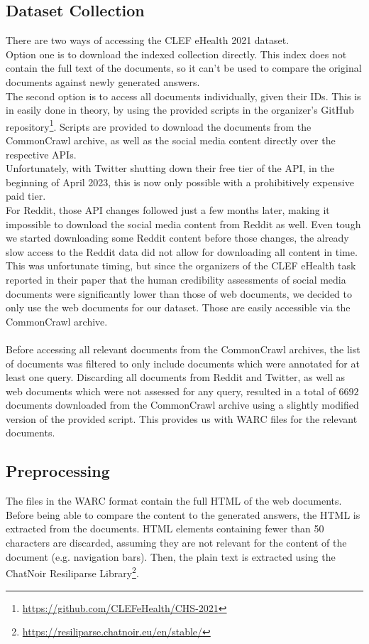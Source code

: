 \subsection{Dataset Collection}
There are two ways of accessing the CLEF eHealth 2021 dataset.
\\
Option one is to download the indexed collection directly.
This index does not contain the full text of the documents, so it can't be used to compare the original documents against newly generated answers.
\\
The second option is to access all documents individually, given their IDs.
This is in easily done in theory, by using the provided scripts in the organizer's GitHub repository\footnote{\url{https://github.com/CLEFeHealth/CHS-2021}}.
Scripts are provided to download the documents from the CommonCrawl archive, as well as the social media content directly over the respective APIs.
\\
Unfortunately, with Twitter shutting down their free tier of the API, in the beginning of April 2023, this is now only possible with a prohibitively expensive paid tier.
\\
For Reddit, those API changes followed just a few months later, making it impossible to download the social media content from Reddit as well.
Even tough we started downloading some Reddit content before those changes, the already slow access to the Reddit data did not allow for downloading all content in time.
\\
This was unfortunate timing, but since the organizers of the CLEF eHealth task reported in their paper that the human credibility assessments of social media documents were significantly lower than those of web documents, we decided to only use the web documents for our dataset.
Those are easily accessible via the CommonCrawl archive.
\\
\\
Before accessing all relevant documents from the CommonCrawl archives, the list of documents was filtered to only include documents which were annotated for at least one query.
Discarding all documents from Reddit and Twitter, as well as web documents which were not assessed for any query, resulted in a total of $6692$ documents downloaded from the CommonCrawl archive using a slightly modified version of the provided script.
This provides us with WARC files for the relevant documents.

\subsection{Preprocessing}
The files in the WARC format contain the full HTML of the web documents.
Before being able to compare the content to the generated answers, the HTML is extracted from the documents.
HTML elements containing fewer than 50 characters are discarded, assuming they are not relevant for the content of the document (e.g. navigation bars).
Then, the plain text is extracted using the ChatNoir Resiliparse Library\footnote{\url{https://resiliparse.chatnoir.eu/en/stable/}}.


